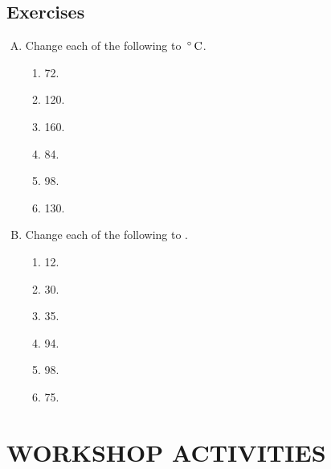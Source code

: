 \subsection*{Exercises}
\begin{enumerate}[A.]
\item Change each of the following to $\,\mathrm{^{\circ}}\,\mathrm{C}$.
\begin{multicols}{2}
\begin{enumerate}[1.]
\item 72\degree\F.
\item 120\degree\F.
\item 160\degree\F.
\item 84\degree\F.
\item 98\degree\F.
\item 130\degree\F.
\end{enumerate}
\end{multicols}
\item Change each of the following to \degree\F.
\begin{multicols}{2}
\begin{enumerate}[1.]
\item 12\degree\C.
\item 30\degree\C.
\item 35\degree\C.
\item 94\degree\C.
\item 98\degree\C.
\item 75\degree\C.
\end{enumerate}
\end{multicols}
\end{enumerate}

\section*{WORKSHOP ACTIVITIES}
